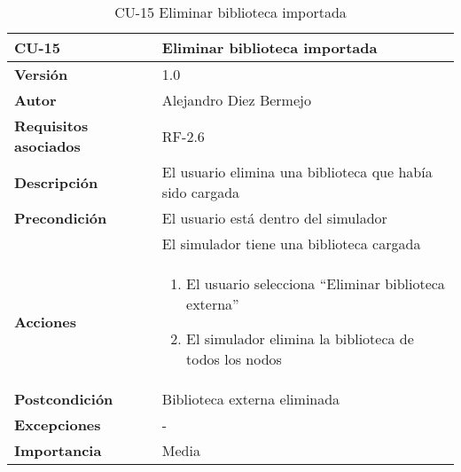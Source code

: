 \begin{table}[p]
	\centering
	\begin{tabularx}{\linewidth}{ p{} p{} }
		\toprule
		\textbf{CU-15}    & \textbf{Eliminar biblioteca importada}\\
		\toprule
		\textbf{Versión}              & 1.0    \\
		\textbf{Autor}                & Alejandro Diez Bermejo \\
		\textbf{Requisitos asociados} & RF-2.6 \\
		\textbf{Descripción}          & El usuario elimina una biblioteca que había sido cargada \\
        \textbf{Precondición}         & El usuario está dentro del simulador \\
                                      & El simulador tiene una biblioteca cargada \\
		\textbf{Acciones}             &
		\begin{enumerate}
			\def\labelenumi{\arabic{enumi}.}
			\tightlist
			\item El usuario selecciona ``Eliminar biblioteca externa''
            \item El simulador elimina la biblioteca de todos los nodos
		\end{enumerate}\\
		\textbf{Postcondición}        & Biblioteca externa eliminada \\
		\textbf{Excepciones}          & - \\
		\textbf{Importancia}          & Media \\
		\bottomrule
	\end{tabularx}
	\caption{CU-15 Eliminar biblioteca importada}
\end{table}

